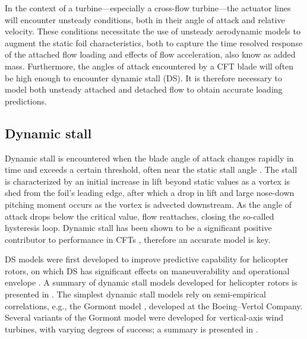 In the context of a turbine---especially a cross-flow turbine---the actuator
lines will encounter unsteady conditions, both in their angle of attack and
relative velocity. These conditions necessitate the use of unsteady aerodynamic
models to augment the static foil characteristics, both to capture the time
resolved response of the attached flow loading and effects of flow acceleration,
also know as added mass. Furthermore, the angles of attack encountered by a CFT
blade will often be high enough to encounter dynamic stall (DS). It is therefore
necessary to model both unsteady attached and detached flow to obtain accurate
loading predictions.


\subsection{Dynamic stall}

Dynamic stall is encountered when the blade angle of attack changes rapidly in
time and exceeds a certain threshold, often near the static stall angle
\cite{McCroskey1981}. The stall is characterized by an initial increase in lift
beyond static values as a vortex is shed from the foil's leading edge, after
which a drop in lift and large nose-down pitching moment occurs as the vortex is
advected downstream. As the angle of attack drops below the critical value, flow
reattaches, closing the so-called hysteresis loop. Dynamic stall has been shown
to be a significant positive contributor to performance in CFTs \cite{Para2002,
    Urbina2013}, therefore an accurate model is key.


DS models were first developed to improve predictive capability for helicopter
rotors, on which DS has significant effects on maneuverability and operational
envelope \cite{Bousman2000}. A summary of dynamic stall models developed for
helicopter rotors is presented in \cite{Leishman2006}. The simplest dynamic
stall models rely on semi-empirical correlations, e.g., the Gormont model
\cite{Gormont1973}, developed at the Boeing--Vertol Company. Several variants of
the Gormont model were developed for vertical-axis wind turbines, with varying
degrees of success; a summary is presented in \cite{Para2002}.

